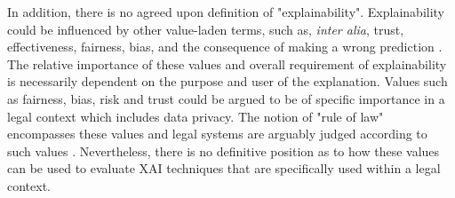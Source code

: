 In addition, there is no agreed upon definition of "explainability". Explainability could be influenced by other value-laden terms, such as, \textit{inter alia}, trust, effectiveness, fairness, bias, and the consequence of making a wrong prediction \cite{rosenfeld2021}. The relative importance of these values and overall requirement of explainability is necessarily dependent on the purpose and user of the explanation. Values such as fairness, bias, risk and trust could be argued to be of specific importance in a legal context which includes data privacy. The notion of "rule of law" encompasses these values and legal systems are arguably judged according to such values \cite{greenstein2022}. Nevertheless, there is no definitive position as to how these values can be used to evaluate XAI techniques that are specifically used within a legal context.

